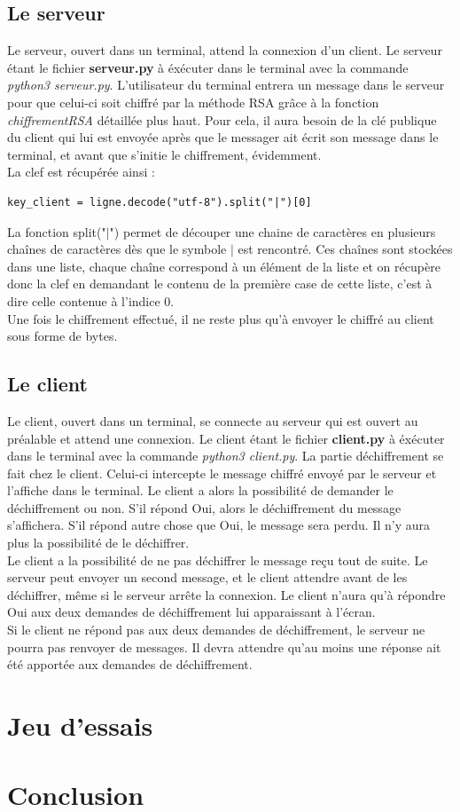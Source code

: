 \documentclass[12pt]{article}
\theoremstyle{definition}
\begin{document}
	\subsection{Le serveur}
	Le serveur, ouvert dans un terminal, attend la connexion d'un client. Le serveur étant le fichier \textbf{serveur.py} à éxécuter dans le terminal avec la commande \textit{python3 serveur.py}.
L'utilisateur du terminal entrera un message dans le serveur pour que celui-ci soit chiffré par la méthode RSA grâce à la fonction \textit{chiffrementRSA} détaillée plus haut. Pour cela, il aura besoin de la clé publique du client qui lui est envoyée après que le messager ait écrit son message dans le terminal, et avant que s'initie le chiffrement, évidemment. \\
La clef est récupérée ainsi :
\begin{verbatim}
key_client = ligne.decode("utf-8").split("|")[0]
\end{verbatim}
La fonction split("$\mid $") permet de découper une chaine de caractères en plusieurs chaînes de caractères dès que le symbole $\mid$ est rencontré. Ces chaînes sont stockées dans une liste, chaque chaîne correspond à un élément de la liste et on récupère donc la clef en demandant le contenu de la première case de cette liste, c'est à dire celle contenue à l'indice $0$.\\
Une fois le chiffrement effectué, il ne reste plus qu'à envoyer le chiffré au client sous forme de bytes. 
		
	\subsection{Le client}
	Le client, ouvert dans un terminal, se connecte au serveur qui est ouvert au préalable et attend une connexion. Le client étant le fichier \textbf{client.py} à éxécuter dans le terminal avec la commande \textit{python3 client.py}. La partie déchiffrement se fait chez le client. Celui-ci intercepte le message chiffré envoyé par le serveur et l'affiche dans le terminal. Le client a alors la possibilité de demander le déchiffrement ou non. S'il répond Oui, alors le déchiffrement du message s'affichera. S'il répond autre chose que Oui, le message sera perdu. Il n'y aura plus la possibilité de le déchiffrer.\\
Le client a la possibilité de ne pas déchiffrer le message reçu tout de suite. Le serveur peut envoyer un second message, et le client attendre avant de les déchiffrer, même si le serveur arrête la connexion. Le client n'aura qu'à répondre Oui aux deux demandes de déchiffrement lui apparaissant à l'écran.\\
Si le client ne répond pas aux deux demandes de déchiffrement, le serveur ne pourra pas renvoyer de messages. Il devra attendre qu'au moins une réponse ait été apportée aux demandes de déchiffrement. 
	
\vfill \eject
\section{Jeu d'essais}

\section{Conclusion}
\end{document}
